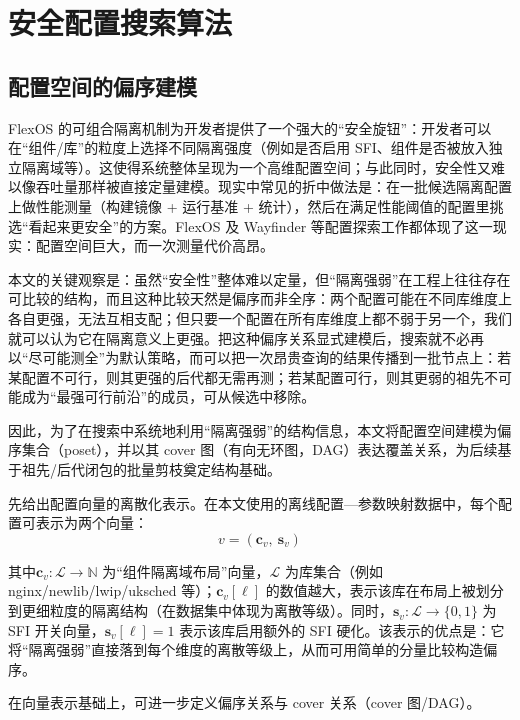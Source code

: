 \documentclass[UTF8,a4paper,12pt,twoside]{ctexart}  %
\begin{document}
\cleardoublepage
\section{安全配置搜索算法}

\subsection{配置空间的偏序建模}

FlexOS 的可组合隔离机制为开发者提供了一个强大的``安全旋钮''：开发者可以在``组件/库''的粒度上选择不同隔离强度（例如是否启用 SFI、组件是否被放入独立隔离域等）\cite{1}。这使得系统整体呈现为一个高维配置空间；与此同时，安全性又难以像吞吐量那样被直接定量建模。现实中常见的折中做法是：在一批候选隔离配置上做性能测量（构建镜像 + 运行基准 + 统计），然后在满足性能阈值的配置里挑选``看起来更安全''的方案。FlexOS 及 Wayfinder 等配置探索工作都体现了这一现实：配置空间巨大，而一次测量代价高昂\cite{3}。

本文的关键观察是：虽然``安全性''整体难以定量，但``隔离强弱''在工程上往往存在可比较的结构，而且这种比较天然是偏序而非全序：两个配置可能在不同库维度上各自更强，无法互相支配；但只要一个配置在所有库维度上都不弱于另一个，我们就可以认为它在隔离意义上更强。把这种偏序关系显式建模后，搜索就不必再以``尽可能测全''为默认策略，而可以把一次昂贵查询的结果传播到一批节点上：若某配置不可行，则其更强的后代都无需再测；若某配置可行，则其更弱的祖先不可能成为``最强可行前沿''的成员，可从候选中移除。

因此，为了在搜索中系统地利用``隔离强弱''的结构信息，本文将配置空间建模为偏序集合（poset），并以其 cover 图（有向无环图，DAG）表达覆盖关系，为后续基于祖先/后代闭包的批量剪枝奠定结构基础。

先给出配置向量的离散化表示。在本文使用的离线配置---参数映射数据中，每个配置可表示为两个向量：
\begin{equation}
  v = (\mathbf{c}_v,\ \mathbf{s}_v)
\end{equation}

其中\(\mathbf{c}_v: \mathcal{L}\to \mathbb{N}\)
为``组件隔离域布局''向量，\(\mathcal{L}\) 为库集合（例如
nginx/newlib/lwip/uksched 等）；\(\mathbf{c}_v[\ell]\)
的数值越大，表示该库在布局上被划分到更细粒度的隔离结构（在数据集中体现为离散等级）。同时，\(\mathbf{s}_v: \mathcal{L}\to \{0,1\}\)
为 SFI 开关向量，\(\mathbf{s}_v[\ell]=1\) 表示该库启用额外的 SFI 硬化。该表示的优点是：它将``隔离强弱''直接落到每个维度的离散等级上，从而可用简单的分量比较构造偏序。

在向量表示基础上，可进一步定义偏序关系与 cover 关系（cover 图/DAG）。
\end{document}
